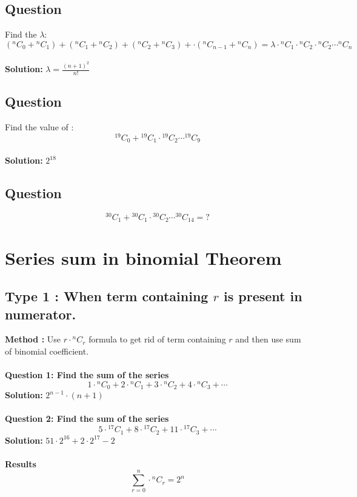 \documentclass[12pt]{article}
\begin{document}
\subsection{Question}
Find the $\lambda$: \\
\[
({}^{n}C_{0}+{}^{n}C_{1})+({}^{n}C_{1}+{}^{n}C_{2})+({}^{n}C_{2}+{}^{n}C_{3})+\cdot({}^{n}C_{n-1}+{}^{n}C_{n}) = \lambda \cdot {}^{n}C_{1} \cdot {}^{n}C_{2}\cdot {}^{n}C_{2}\cdots {}^{n}C_{n}
\] \\
\textbf{Solution: } $\lambda = \frac{(n+1)^2}{n!}$

\subsection{Question}
Find the value of : 
\[
{}^{19}C_{0} + {}^{19}C_{1}\cdot {}^{19}C_{2}\cdots {}^{19}C_{9}
\] \\
\textbf{Solution: } $2^{18}$

\subsection{Question}
\[
{}^{30}C_{1} + {}^{30}C_{1}\cdot {}^{30}C_{2}\cdots {}^{30}C_{14} = ?
\]

\newpage
\section{Series sum in binomial Theorem}
\subsection{Type 1 : When term containing $r$ is present in numerator.}
\textbf{Method : } Use $r\cdot{}^{n}C_{r}$ formula to get rid of term containing $r$ and then use sum of binomial coefficient.
\\ \\
\textbf{Question 1: Find the sum of the series}\
\[
1 \cdot{}^{n}C_{0}+2 \cdot{}^{n}C_{1}+3 \cdot{}^{n}C_{2}+ 4\cdot{}^{n}C_{3}+\cdots
\]
\textbf{Solution: } $2^{n-1}\cdot (n+1)$
\\
\\
\textbf{Question 2: Find the sum of the series}\
\[
5 \cdot{}^{17}C_{1}+8 \cdot{}^{17}C_{2}+11 \cdot{}^{17}C_{3}+ \cdots
\]
\textbf{Solution: } $51\cdot 2^{16}+ 2 \cdot 2^{17}-2$
\\
\\
\textbf{Results} \\
\[
\boxed{\sum_{r=0}^{n} \cdot {}^{n}C_{r} = 2^n }
\]
\end{document}
